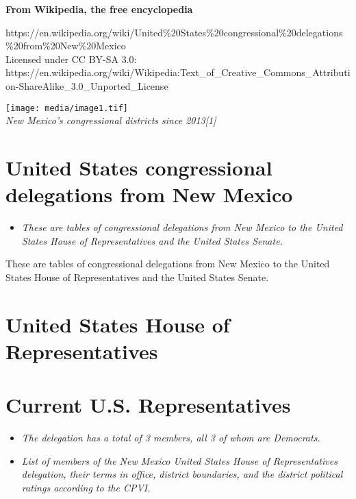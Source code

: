 \textbf{From Wikipedia, the free encyclopedia}

https://en.wikipedia.org/wiki/United\%20States\%20congressional\%20delegations\%20from\%20New\%20Mexico\\
Licensed under CC BY-SA 3.0:\\
https://en.wikipedia.org/wiki/Wikipedia:Text\_of\_Creative\_Commons\_Attribution-ShareAlike\_3.0\_Unported\_License

\texttt{[image: media/image1.tif]}\\
\emph{New Mexico's congressional districts since 2013{[}1{]}}

\section{United States congressional delegations from New
Mexico}\label{united-states-congressional-delegations-from-new-mexico}

\begin{itemize}
\item
  \emph{These are tables of congressional delegations from New Mexico to
  the United States House of Representatives and the United States
  Senate.}
\end{itemize}

These are tables of congressional delegations from New Mexico to the
United States House of Representatives and the United States Senate.

\section{United States House of
Representatives}\label{united-states-house-of-representatives}

\section{Current U.S.
Representatives}\label{current-u.s.-representatives}

\begin{itemize}
\item
  \emph{The delegation has a total of 3 members, all 3 of whom are
  Democrats.}
\item
  \emph{List of members of the New Mexico United States House of
  Representatives delegation, their terms in office, district
  boundaries, and the district political ratings according to the CPVI.}
\end{itemize}

